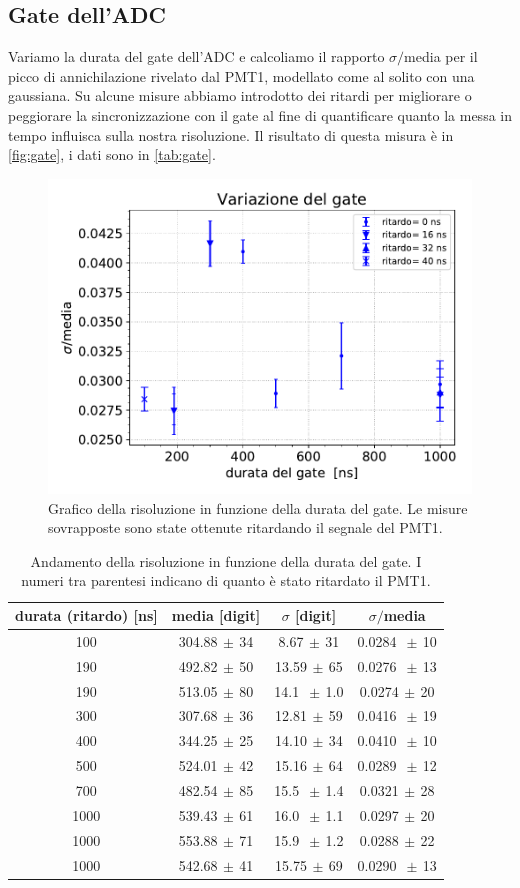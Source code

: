 \subsection{Gate dell'ADC}

Variamo la durata del gate dell'ADC e calcoliamo il rapporto $\sigma\!/$\!media per il picco di annichilazione rivelato dal PMT1, modellato come al solito con una gaussiana.
Su alcune misure abbiamo introdotto dei ritardi per migliorare o peggiorare la sincronizzazione con il gate al fine di quantificare quanto la messa in tempo influisca sulla nostra risoluzione. Il risultato di questa misura è in \autoref{fig:gate}, i dati sono in \autoref{tab:gate}.

\begin{figure}[h]
\centering
\includegraphics[width=20 em]{immagini/gate}
\caption{Grafico della risoluzione in funzione della durata del gate. Le misure sovrapposte sono state ottenute ritardando il segnale del PMT1.}
\label{fig:gate}
\end{figure}

\begin{table}[h]
\centering
\begin{tabular}{c|c|c|c}
durata (ritardo) [ns] & media [digit] & $\sigma$ [digit] & $\sigma\!/$\!media\\
\hline
 100 & 304.88$\,\pm\,$34 &  8.67$\,\pm\,$31 & 0.0284 $\,\pm\,$10 \\  
 190 & 492.82$\,\pm\,$50 & 13.59$\,\pm\,$65 & 0.0276 $\,\pm\,$13 \\
 190 & 513.05$\,\pm\,$80 & 14.1 $\,\pm\,$1.0 & 0.0274$\,\pm\,$20 \\
 300 & 307.68$\,\pm\,$36 & 12.81$\,\pm\,$59 & 0.0416 $\,\pm\,$19 \\
 400 & 344.25$\,\pm\,$25 & 14.10$\,\pm\,$34 & 0.0410 $\,\pm\,$10 \\
 500 & 524.01$\,\pm\,$42 & 15.16$\,\pm\,$64 & 0.0289 $\,\pm\,$12 \\
 700 & 482.54$\,\pm\,$85 & 15.5 $\,\pm\,$1.4 & 0.0321$\,\pm\,$28 \\
1000 & 539.43$\,\pm\,$61 & 16.0 $\,\pm\,$1.1 & 0.0297$\,\pm\,$20 \\
1000 & 553.88$\,\pm\,$71 & 15.9 $\,\pm\,$1.2 & 0.0288$\,\pm\,$22 \\
1000 & 542.68$\,\pm\,$41 & 15.75$\,\pm\,$69 & 0.0290 $\,\pm\,$13 
\end{tabular}

\caption{Andamento della risoluzione in funzione della durata del gate. I numeri tra parentesi indicano di quanto è stato ritardato il PMT1.}
\label{tab:gate}
\end{table}

